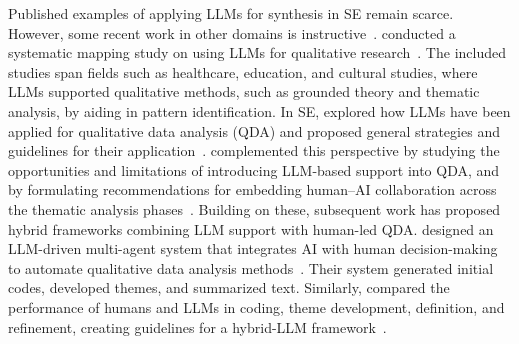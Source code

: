 Published examples of applying LLMs for synthesis in SE remain scarce. However, some recent work in other domains is instructive~\cite{DBLP:journals/ase/BanoHZT24}.
\citeauthor{DBLP:conf/wsese/BarrosANKKNB25} conducted a systematic mapping study on using LLMs for qualitative research~\cite{DBLP:conf/wsese/BarrosANKKNB25}. The included studies span fields such as healthcare, education, and cultural studies, where LLMs supported qualitative methods, such as grounded theory and thematic analysis, by aiding in pattern identification.
In SE, \citeauthor{DBLP:conf/wsese/LecaVSS25} explored how LLMs have been applied for qualitative data analysis (QDA) and proposed general strategies and guidelines for their application~\cite{DBLP:conf/wsese/LecaVSS25}. \citeauthor{DBLP:journals/corr/abs-2511-14528} complemented this perspective by studying the opportunities and limitations of introducing LLM-based support into QDA, and by formulating recommendations for embedding human–AI collaboration across the thematic analysis phases~\cite{DBLP:journals/corr/abs-2511-14528}. Building on these, subsequent work has proposed hybrid frameworks combining LLM support with human-led QDA. \citeauthor{DBLP:journals/corr/abs-2402-01386} designed an LLM-driven multi-agent system that integrates AI with human decision-making to automate qualitative data analysis methods~\cite{DBLP:journals/corr/abs-2402-01386}. Their system generated initial codes, developed themes, and summarized text. Similarly, \citeauthor{DBLP:journals/corr/abs-2510-18456} compared the performance of humans and LLMs in coding, theme development, definition, and refinement, creating guidelines for a hybrid-LLM framework~\cite{DBLP:journals/corr/abs-2510-18456}.
